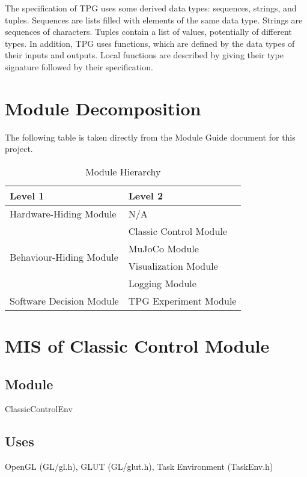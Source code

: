 \documentclass[12pt, titlepage]{article}
\begin{document}
\noindent
The specification of TPG uses some derived data types: sequences, strings, and
tuples. Sequences are lists filled with elements of the same data type. Strings
are sequences of characters. Tuples contain a list of values, potentially of
different types. In addition, TPG uses functions, which
are defined by the data types of their inputs and outputs. Local functions are
described by giving their type signature followed by their specification.

\section{Module Decomposition}

The following table is taken directly from the Module Guide document for this project.

\begin{table}[h!]
  \centering
  \begin{tabular}{p{} p{}}
  \toprule
  \textbf{Level 1} & \textbf{Level 2}\\
  \midrule
  
  {Hardware-Hiding Module} & N/A \\
  \midrule
  
  \multirow{4}{0.3\textwidth}{Behaviour-Hiding Module} & Classic Control Module \\
  & MuJoCo Module\\
  & Visualization Module\\
  & Logging Module\\
  \midrule
  
  \multirow{1}{0.3\textwidth}{Software Decision Module} & {TPG Experiment Module}\\
  \bottomrule
  
  \end{tabular}
  \caption{Module Hierarchy}
  \label{TblMH}
  \end{table}

\section{MIS of Classic Control Module} \label{ClassicControl Module}

\subsection{Module}
ClassicControlEnv

\subsection{Uses}
OpenGL (GL/gl.h), GLUT (GL/glut.h), Task Environment (TaskEnv.h)
\end{document}
